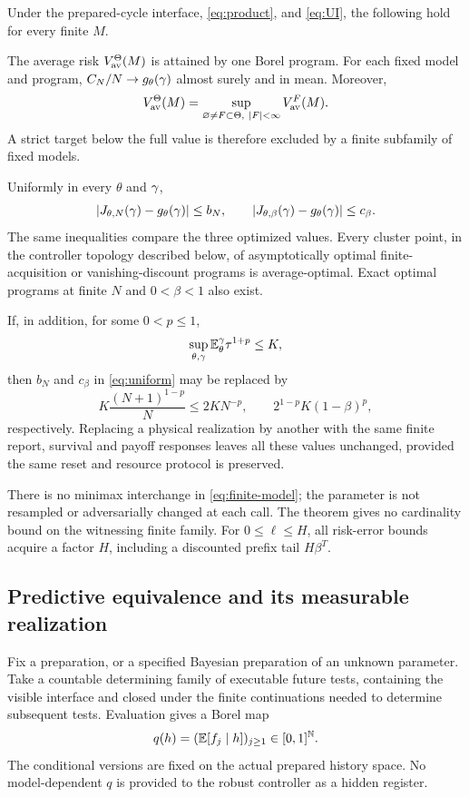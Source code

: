 \begin{theorem}\label{thm:renewal}
Under the prepared-cycle interface, \eqref{eq:product}, and \eqref{eq:UI}, the following hold for every finite $M$.

The average risk $V_{\mathrm{av}}^\Theta(M)$ is attained by one Borel program. For each fixed model and program, $C_N/N\to g_\theta(\gamma)$ almost surely and in mean. Moreover,
\begin{equation}\label{eq:finite-model}
 V_{\mathrm{av}}^\Theta(M)=
 \sup_{\varnothing\ne F\subset\Theta,\ |F|<\infty}V_{\mathrm{av}}^F(M).
\end{equation}
A strict target below the full value is therefore excluded by a finite subfamily of fixed models.

Uniformly in every $\theta$ and $\gamma$,
\begin{equation}\label{eq:uniform}
 |J_{\theta,N}(\gamma)-g_\theta(\gamma)|\le b_N,\qquad
 |J_{\theta,\beta}(\gamma)-g_\theta(\gamma)|\le c_\beta.
\end{equation}
The same inequalities compare the three optimized values. Every cluster point, in the controller topology described below, of asymptotically optimal finite-acquisition or vanishing-discount programs is average-optimal. Exact optimal programs at finite $N$ and $0<\beta<1$ also exist.

If, in addition, for some $0<p\le1$,
\begin{equation}\label{eq:moment}
 \sup_{\theta,\gamma}\mathbb E_\theta^\gamma\tau^{1+p}\le K,
\end{equation}
then $b_N$ and $c_\beta$ in \eqref{eq:uniform} may be replaced by
\begin{equation}\label{eq:moment-rates}
 K\frac{(N+1)^{1-p}}{N}\le2K N^{-p},\qquad
 2^{1-p}K(1-\beta)^p,
\end{equation}
respectively. Replacing a physical realization by another with the same finite report, survival and payoff responses leaves all these values unchanged, provided the same reset and resource protocol is preserved.
\end{theorem}
There is no minimax interchange in \eqref{eq:finite-model}; the parameter is not resampled or adversarially changed at each call. The theorem gives no cardinality bound on the witnessing finite family. For $0\le\ell\le H$, all risk-error bounds acquire a factor $H$, including a discounted prefix tail $H\beta^T$.

\subsection{Predictive equivalence and its measurable realization}
Fix a preparation, or a specified Bayesian preparation of an unknown parameter. Take a countable determining family of executable future tests, containing the visible interface and closed under the finite continuations needed to determine subsequent tests. Evaluation gives a Borel map
\begin{equation}\label{eq:quotient}
 q(h)=(\mathbb E[f_j\mid h])_{j\ge1}\in[0,1]^{\mathbb N}.
\end{equation}
The conditional versions are fixed on the actual prepared history space. No model-dependent $q$ is provided to the robust controller as a hidden register.

